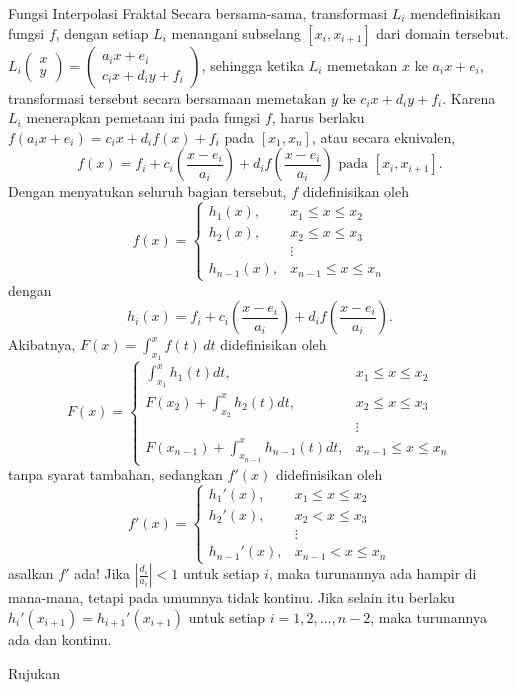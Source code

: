 \begin{digression}{Fungsi Interpolasi Fraktal}
Secara bersama-sama, transformasi $L_{i}$ mendefinisikan fungsi $f$,
dengan setiap $L_{i}$ menangani subselang $[x_{i},x_{i+1}]$ dari
domain tersebut. $L_{i}\left(\begin{array}{c}
x\\
y
\end{array}\right)=\left(\begin{array}{c}
a_{i}x+e_{i}\\
c_{i}x+d_{i}y+f_{i}
\end{array}\right)$, sehingga ketika $L_{i}$ memetakan $x$ ke $a_{i}x+e_{i}$, transformasi
tersebut secara bersamaan memetakan $y$ ke $c_{i}x+d_{i}y+f_{i}$.
Karena $L_{i}$ menerapkan pemetaan ini pada fungsi $f$, harus berlaku
$f(a_{i}x+e_{i})=c_{i}x+d_{i}f(x)+f_{i}$ pada $[x_{1},x_{n}]$, atau
secara ekuivalen,
\[
f(x)=f_{i}+c_{i}\left(\frac{x-e_{i}}{a_{i}}\right)+d_{i}f\left(\frac{x-e_{i}}{a_{i}}\right)\mbox{ pada }[x_{i},x_{i+1}].
\]
Dengan menyatukan seluruh bagian tersebut, $f$ didefinisikan oleh
\[
f(x)=\begin{cases}
h_{1}(x), & x_{1}\leq x\leq x_{2}\\
h_{2}(x), & x_{2}\leq x\leq x_{3}\\
 & \vdots\\
h_{n-1}(x), & x_{n-1}\leq x\leq x_{n}
\end{cases}
\]
dengan
\[
h_{i}(x)=f_{i}+c_{i}\left(\frac{x-e_{i}}{a_{i}}\right)+d_{i}f\left(\frac{x-e_{i}}{a_{i}}\right).
\]
Akibatnya, $F(x)=\int_{x_{1}}^{x}f(t)\,dt$ didefinisikan oleh
\[
F(x)=\begin{cases}
\int_{x_{1}}^{x}h_{1}(t)dt, & x_{1}\leq x\leq x_{2}\\
F(x_{2})+\int_{x_{2}}^{x}h_{2}(t)dt, & x_{2}\leq x\leq x_{3}\\
 & \vdots\\
F(x_{n-1})+\int_{x_{n-1}}^{x}h_{n-1}(t)dt, & x_{n-1}\leq x\leq x_{n}
\end{cases}
\]
tanpa syarat tambahan, sedangkan $f'(x)$ didefinisikan oleh
\[
f'(x)=\begin{cases}
h_{1}'(x), & x_{1}\leq x\leq x_{2}\\
h_{2}'(x), & x_{2}<x\leq x_{3}\\
 & \vdots\\
h_{n-1}'(x), & x_{n-1}<x\leq x_{n}
\end{cases}
\]
asalkan $f'$ ada! Jika $\left|\frac{d_{i}}{a_{i}}\right|<1$ untuk
setiap $i$, maka turunannya ada hampir di mana-mana, tetapi pada
umumnya tidak kontinu. Jika selain itu berlaku $h_{i}'(x_{i+1})=h_{i+1}'(x_{i+1})$
untuk setiap $i=1,2,\ldots,n-2$, maka turunannya ada dan kontinu.
\begin{description}
\item [{Rujukan}] \cite[Bab 6]{barnsley}
\end{description}
\noindent\end{digression}

